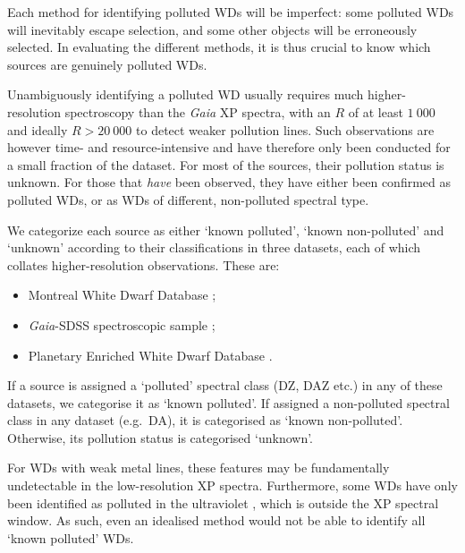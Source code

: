 \documentclass[fleqn,usenatbib]{rasti}
\begin{document}
Each method for identifying polluted WDs will be imperfect: some polluted WDs will inevitably escape selection, and some other objects will be erroneously selected.
In evaluating the different methods, it is thus crucial to know which sources are genuinely polluted WDs.

Unambiguously identifying a polluted WD usually requires much higher-resolution spectroscopy than the \textit{Gaia} XP spectra, with an $R$ of at least $1~000$ and ideally $R>20~000$ to detect weaker pollution lines.
Such observations are however time- and resource-intensive and have therefore only been conducted for a small fraction of the dataset.
For most of the sources, their pollution status is unknown.
For those that \textit{have} been observed, they have either been confirmed as polluted WDs, or as WDs of different, non-polluted spectral type.

We categorize each source as either `known polluted', `known non-polluted' and `unknown' according to their classifications in three datasets, each of which collates higher-resolution observations.
These are:
\begin{itemize}
\item Montreal White Dwarf Database \citep[MWDD;][]{dufour17};
\item \textit{Gaia}-SDSS spectroscopic sample \citep{gentilefusillo21};
\item Planetary Enriched White Dwarf Database \citep[PEWDD;][]{williams24}.
\end{itemize}
If a source is assigned a `polluted' spectral class (DZ, DAZ etc.) in any of these datasets, we categorise it as `known polluted'.
If assigned a non-polluted spectral class in any dataset (e.g.\ DA), it is categorised as `known non-polluted'.
Otherwise, its pollution status is categorised `unknown'.

For WDs with weak metal lines, these features may be fundamentally undetectable in the low-resolution XP spectra.
Furthermore, some WDs have only been identified as polluted in the ultraviolet \citep[$\lambda < 300\,\text{nm}$; e.g.][]{koester14, ouldrouis24}, which is outside the XP spectral window.
As such, even an idealised method would not be able to identify all `known polluted' WDs.
\end{document}
